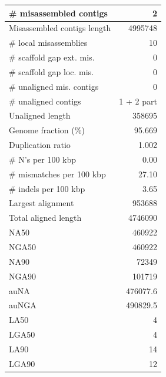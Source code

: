 \documentclass[12pt,a4paper]{article}
\begin{document}
\begin{table}[ht]
\begin{center}
\begin{tabular}{|l*{1}{|r}|}
\# misassembled contigs & 2 \\ \hline
Misassembled contigs length & 4995748 \\ \hline
\# local misassemblies & 10 \\ \hline
\# scaffold gap ext. mis. & 0 \\ \hline
\# scaffold gap loc. mis. & 0 \\ \hline
\# unaligned mis. contigs & 0 \\ \hline
\# unaligned contigs & 1 + 2 part \\ \hline
Unaligned length & 358695 \\ \hline
Genome fraction (\%) & 95.669 \\ \hline
Duplication ratio & 1.002 \\ \hline
\# N's per 100 kbp & 0.00 \\ \hline
\# mismatches per 100 kbp & 27.10 \\ \hline
\# indels per 100 kbp & 3.65 \\ \hline
Largest alignment & 953688 \\ \hline
Total aligned length & 4746090 \\ \hline
NA50 & 460922 \\ \hline
NGA50 & 460922 \\ \hline
NA90 & 72349 \\ \hline
NGA90 & 101719 \\ \hline
auNA & 476077.6 \\ \hline
auNGA & 490829.5 \\ \hline
LA50 & 4 \\ \hline
LGA50 & 4 \\ \hline
LA90 & 14 \\ \hline
LGA90 & 12 \\ \hline
\end{tabular}
\end{center}
\end{table}
\end{document}
